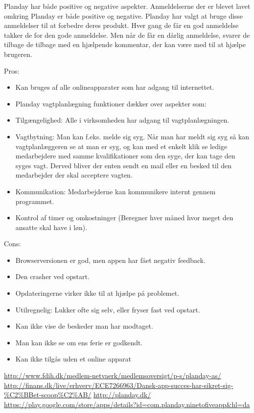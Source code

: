 \documentclass[11pt, twoside, a4paper, openright]{report}
\begin{document}
Planday har både positive og negative aspekter. Anmeldelserne der er blevet lavet omkring Planday er både positive og negative. Planday har valgt at bruge disse anmeldelser til at forbedre deres produkt. Hver gang de får en god anmeldelse takker de for den gode anmeldelse. Men når de får en dårlig anmeldelse, svarer de tilbage de tilbage med en hjælpende kommentar, der kan være med til at hjælpe brugeren.

Pros:
\begin{itemize}
\item Kan bruges af alle onlineapparater som har adgang til internettet. 
\item Planday vagtplanlægning funktioner dækker over aspekter som:
\item Tilgængelighed: Alle i virksomheden har adgang til vagtplanlægningen.
\item Vagtbytning: Man kan f.eks. melde sig syg. Når man har meldt sig syg så kan vagtplanlæggeren se at man er syg, og kan med et enkelt klik se ledige medarbejdere med samme kvalifikationer som den syge, der kan tage den syges vagt. Derved bliver der enten sendt en mail eller en besked til den medarbejder der skal acceptere vagten. 
\item Kommunikation: Medarbejderne kan kommunikere internt gennem programmet.
\item Kontrol af timer og omkostninger (Beregner hver måned hvor meget den ansatte skal have i løn).
\end{itemize}

Cons:
\begin{itemize}
\item Browserversionen er god, men appen har fået negativ feedback.
\item Den crasher ved opstart.
\item Opdateringerne virker ikke til at hjælpe på problemet.
\item Utilregnelig: Lukker ofte sig selv, eller fryser fast ved opstart.
\item Kan ikke vise de beskeder man har modtaget.
\item Man kan ikke se om ens ferie er godkendt.
\item Kan ikke tilgås uden et online apparat
\end{itemize}


\url{http://www.fdih.dk/medlem-netvaerk/medlemsoversigt/p-s/planday-as/}
\url{http://finans.dk/live/erhverv/ECE7266963/Dansk-app-succes-har-sikret-sig-%C2%BBet-scoop%C2%AB/}
\url{http://planday.dk/}
\url{https://play.google.com/store/apps/details?id=com.planday.ninetofiveapp&hl=da}
\end{document}
